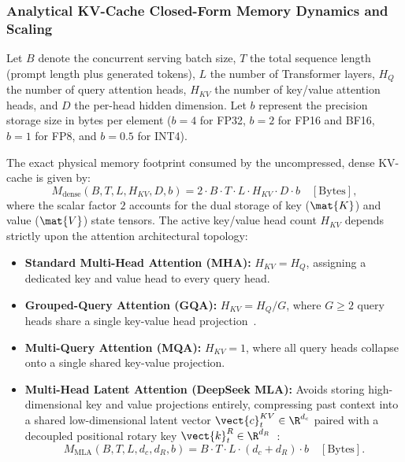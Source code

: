 \subsubsection{Analytical KV-Cache Closed-Form Memory Dynamics and Scaling}
\label{sec:results_kv_closed_form}

Let $B$ denote the concurrent serving batch size, $T$ the total sequence length (prompt length plus generated tokens), $L$ the number of Transformer layers, $H_Q$ the number of query attention heads, $H_{KV}$ the number of key/value attention heads, and $D$ the per-head hidden dimension. Let $b$ represent the precision storage size in bytes per element ($b=4$ for FP32, $b=2$ for FP16 and BF16, $b=1$ for FP8, and $b=0.5$ for INT4). 

The exact physical memory footprint consumed by the uncompressed, dense KV-cache is given by:
\begin{equation}
\label{eq:dense_kv_footprint_exact}
M_{\text{dense}}(B, T, L, H_{KV}, D, b) = 2 \cdot B \cdot T \cdot L \cdot H_{KV} \cdot D \cdot b \quad [\text{Bytes}],
\end{equation}
where the scalar factor $2$ accounts for the dual storage of key ($\mat{K}$) and value ($\mat{V}$) state tensors. The active key/value head count $H_{KV}$ depends strictly upon the attention architectural topology:
\begin{itemize}
    \item \textbf{Standard Multi-Head Attention (MHA):} $H_{KV} = H_Q$, assigning a dedicated key and value head to every query head.
    \item \textbf{Grouped-Query Attention (GQA):} $H_{KV} = H_Q / G$, where $G \ge 2$ query heads share a single key-value head projection~\cite{ainslie2023gqa}.
    \item \textbf{Multi-Query Attention (MQA):} $H_{KV} = 1$, where all query heads collapse onto a single shared key-value projection.
    \item \textbf{Multi-Head Latent Attention (DeepSeek MLA):} Avoids storing high-dimensional key and value projections entirely, compressing past context into a shared low-dimensional latent vector $\vect{c}_t^{KV} \in \R^{d_c}$ paired with a decoupled positional rotary key $\vect{k}_t^R \in \R^{d_R}$~\cite{deepseek2024mla}:
    \begin{equation}
    \label{eq:mla_kv_footprint}
    M_{\text{MLA}}(B, T, L, d_c, d_R, b) = B \cdot T \cdot L \cdot (d_c + d_R) \cdot b \quad [\text{Bytes}].
    \end{equation}
\end{itemize}

